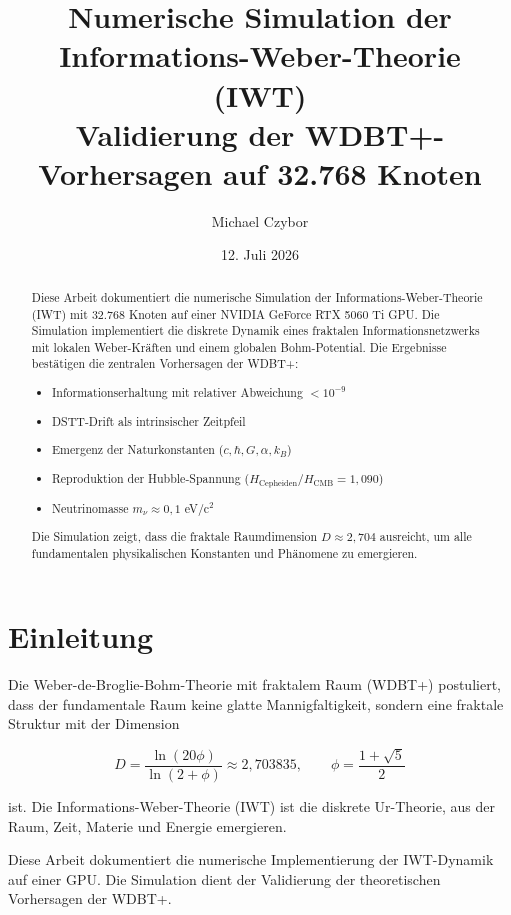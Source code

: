 \documentclass[12pt,a4paper]{article}
\title{%
  Numerische Simulation der Informations-Weber-Theorie (IWT) \\
  \large Validierung der WDBT+-Vorhersagen auf 32.768 Knoten
}
\author{Michael Czybor}
\date{12. Juli 2026}
\begin{document}
\maketitle

\begin{abstract}
Diese Arbeit dokumentiert die numerische Simulation der Informations-Weber-Theorie (IWT) mit 32.768 Knoten auf einer NVIDIA GeForce RTX 5060 Ti GPU. Die Simulation implementiert die diskrete Dynamik eines fraktalen Informationsnetzwerks mit lokalen Weber-Kräften und einem globalen Bohm-Potential. Die Ergebnisse bestätigen die zentralen Vorhersagen der WDBT+:
\begin{itemize}
\item Informationserhaltung mit relativer Abweichung $< 10^{-9}$
\item DSTT-Drift als intrinsischer Zeitpfeil
\item Emergenz der Naturkonstanten ($c, \hbar, G, \alpha, k_B$)
\item Reproduktion der Hubble-Spannung ($H_{\text{Cepheiden}}/H_{\text{CMB}} = 1,090$)
\item Neutrinomasse $m_\nu \approx 0,1$ eV/c$^2$
\end{itemize}
Die Simulation zeigt, dass die fraktale Raumdimension $D \approx 2,704$ ausreicht, um alle fundamentalen physikalischen Konstanten und Phänomene zu emergieren.
\end{abstract}

\newpage

\tableofcontents

\newpage

\section{Einleitung}

Die Weber-de-Broglie-Bohm-Theorie mit fraktalem Raum (WDBT+) postuliert, dass der fundamentale Raum keine glatte Mannigfaltigkeit, sondern eine fraktale Struktur mit der Dimension

\[
D = \frac{\ln(20\phi)}{\ln(2+\phi)} \approx 2,703835, \qquad \phi = \frac{1+\sqrt{5}}{2}
\]

ist. Die Informations-Weber-Theorie (IWT) ist die diskrete Ur-Theorie, aus der Raum, Zeit, Materie und Energie emergieren.

Diese Arbeit dokumentiert die numerische Implementierung der IWT-Dynamik auf einer GPU. Die Simulation dient der Validierung der theoretischen Vorhersagen der WDBT+.
\end{document}
